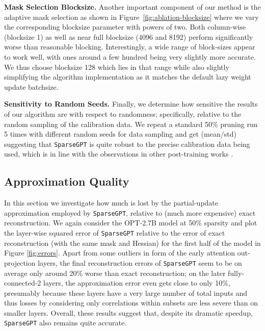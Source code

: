 \documentclass{article}
\theoremstyle{plain}
\theoremstyle{definition}
\theoremstyle{remark}
\renewcommand{\paragraph}[1]{\vspace{-0.1em} \noindent \textbf{#1}}
\newcommand{\sparsegpt}[1]{\texttt{SparseGPT}}
\begin{document}
\paragraph{Mask Selection Blocksize.} Another important component of our method is the adaptive mask selection as shown in Figure~\ref{fig:ablation-blocksize} where we vary the corresponding blocksize parameter with powers of two. Both column-wise (blocksize 1) as well as near full blocksize (4096 and 8192) perform significantly worse than reasonable blocking. Interestingly, a wide range of block-sizes appear to work well, with ones around a few hundred being very slightly more accurate. We thus choose blocksize 128 which lies in that range while also slightly simplifying the algorithm implementation as it matches the default lazy weight update batchsize.

\paragraph{Sensitivity to Random Seeds.} Finally, we determine how sensitive the results of our algorithm are with respect to randomness; specifically, relative to the random sampling of the calibration data. We repeat a standard 50\% pruning run 5 times with different random seeds for data sampling and get  (mean/std) suggesting that \sparsegpt{} is quite robust to the precise calibration data being used, which is in line with the observations in other post-training works \cite{nagel2020up, hubara2021accurate, frantar2022obc}.

\subsection{Approximation Quality}
\label{sec:approx-quality}

In this section we investigate how much is lost by the partial-update approximation employed by \sparsegpt{}, relative to (much more expensive) exact reconstruction. We again consider the OPT-2.7B model at 50\% sparsity and plot the layer-wise squared error of \sparsegpt{} relative to the error of exact reconstruction (with the same mask and Hessian) for the first half of the model in Figure \ref{fig:errors}. Apart from some outliers in form of the early attention out-projection layers, the final reconstruction errors of \sparsegpt{} seem to be on average only around 20\% worse than exact reconstruction; on the later fully-connected-2 layers, the approximation error even gets close to only 10\%, presumably because these layers have a very large number of total inputs and thus losses by considering only correlations within subsets are less severe than on smaller layers. Overall, these results suggest that, despite its dramatic speedup, \sparsegpt{} also remains quite accurate.
\end{document}

